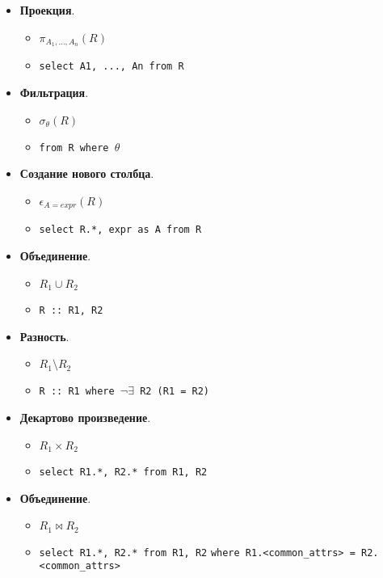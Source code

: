 \begin{itemize}
	\item \textbf{Проекция}.
	      \begin{itemize}
		      \item $\pi_{A_1, \ldots, A_n}(R)$
		      \item \texttt{select A1, ..., An from R}
	      \end{itemize}
	\item \textbf{Фильтрация}.
	      \begin{itemize}
		      \item $\sigma_{\theta}(R)$
		      \item \texttt{from R where $\theta$}
	      \end{itemize}
	\item \textbf{Создание нового столбца}.
	      \begin{itemize}
		      \item $\epsilon_{A=expr}(R)$
		      \item \texttt{select R.*, expr as A from R}
	      \end{itemize}
	\item \textbf{Объединение}.
	      \begin{itemize}
		      \item $R_1 \cup R_2$
		      \item \texttt{R :: R1, R2}
	      \end{itemize}
	\item \textbf{Разность}.
	      \begin{itemize}
		      \item $R_1 \setminus R_2$
		      \item \texttt{R :: R1 where $\neg \exists$ R2 (R1 = R2)}
	      \end{itemize}
	\item \textbf{Декартово произведение}.
	      \begin{itemize}
		      \item $R_1 \times R_2$
		      \item \texttt{select R1.*, R2.* from R1, R2}
	      \end{itemize}
	\item \textbf{Объединение}.
	      \begin{itemize}
		      \item $R_1 \bowtie R_2$
		      \item \texttt{select R1.*, R2.* from R1, R2}
		            \linebreak \texttt{where R1.<common\_attrs> = R2.<common\_attrs>}
	      \end{itemize}
\end{itemize}

